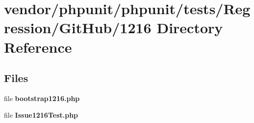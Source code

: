 \section{vendor/phpunit/phpunit/tests/\+Regression/\+Git\+Hub/1216 Directory Reference}
\label{dir_71f1926c61cc32949f65f2c392e2ae02}
\subsection*{Files}
\begin{DoxyCompactItemize}
\item 
file {\bf bootstrap1216.\+php}
\item 
file {\bf Issue1216\+Test.\+php}
\end{DoxyCompactItemize}

